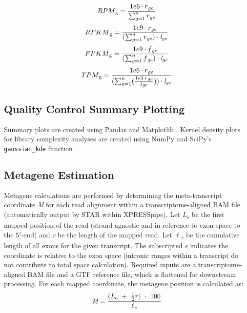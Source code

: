 \documentclass[10pt, oneside]{article}
\begin{document}
  \begin{equation}
    RPM\textsubscript{g} = \frac{1e6 \cdot r\textsubscript{\textit{ge}}}{\sum_{g=1}^{n} r\textsubscript{\textit{ge}}}
  \end{equation}
  \begin{equation}
    RPKM\textsubscript{g} = \frac{1e9 \cdot r\textsubscript{\textit{ge}}}{(\sum_{g=1}^{n} r\textsubscript{\textit{ge}}) \cdot \textit{l} \textsubscript{\textit{ge}}}
  \end{equation}
  \begin{equation}
    FPKM\textsubscript{g} = \frac{1e9 \cdot f\textsubscript{\textit{ge}}}{(\sum_{g=1}^{n} f\textsubscript{\textit{ge}}) \cdot \textit{l} \textsubscript{\textit{ge}}}
  \end{equation}
  \begin{equation}
    TPM\textsubscript{g} = \frac{1e6 \cdot r\textsubscript{\textit{ge}}}{(\sum_{g=1}^{n} (\frac{1e3 \cdot r\textsubscript{\textit{ge}}}{l\textsubscript{\textit{ge}}})) \cdot \textit{l} \textsubscript{\textit{ge}}}
  \end{equation}


\subsection{Quality Control Summary Plotting}
Summary plots are created using Pandas \cite{pandas} and Matplotlib \cite{matplotlib}. Kernel density plots for library complexity analyses are created using NumPy \cite{numpy1, numpy2} and SciPy's \texttt{gaussian\_kde} function \cite{scipy}.

\subsection{Metagene Estimation}
Metagene calculations are performed by determining the meta-transcript coordinate \textit{M} for each read alignment within a transcriptome-aligned BAM file (automatically output by STAR within XPRESSpipe). Let \textit{L\textsubscript{e}} be the first mapped position of the read (strand agnostic and in reference to exon space to the $5'$-end) and \textit{r} be the length of the mapped read. Let \textit{$\ell$\textsubscript{e}} be the cumulative length of all exons for the given transcript. The subscripted \textit{e} indicates the coordinate is relative to the exon space (intronic ranges within a transcript do not contribute to total space calculation). Required inputs are a transcriptome-aligned BAM file and a GTF reference file, which is flattened for downstream processing. For each mapped coordinate, the metagene position is calculated as:
\begin{equation}
\textit{M} = \frac{(L\textsubscript{e}\ +\ \frac{1}{2}r)\ \cdot\ 100}{\textit{$\ell$\textsubscript{e}}}
\end{equation}
\end{document}
